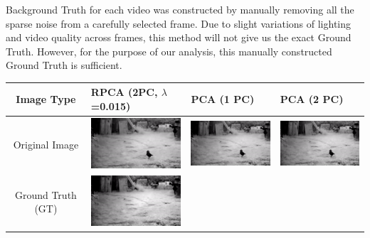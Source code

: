 \documentclass[11pt]{scrartcl} %
\theoremstyle{plain}
\begin{document}
Background Truth for each video was constructed by manually removing all the sparse noise from a carefully selected frame. Due to slight variations of lighting and video quality across frames, this method will not give us the exact Ground Truth. However, for the purpose of our analysis, this manually constructed Ground Truth is sufficient.
\bigskip
\begin{minipage}{\linewidth}
\bgroup
  \begin{tabular}{ | c | m{2.8cm} | m{2.8cm} | m{2.8cm} | }
    \hline
    Image Type & RPCA \linebreak (2PC, $\lambda$=0.015) & PCA \linebreak (1 PC) & PCA \linebreak (2 PC)
    \\ \hline
	Original \linebreak Image
    &
    \begin{minipage}{.3\textwidth}
      \includegraphics[width=\linewidth, width=25mm]{figures_video/crow/original.png}
    \end{minipage}
    & 
    \begin{minipage}{.3\textwidth}
      \includegraphics[width=\linewidth, width=25mm]{figures_video/crow/original.png}
    \end{minipage}
    &
    \begin{minipage}{.3\textwidth}
      \includegraphics[width=\linewidth, width=25mm]{figures_video/crow/original.png}
    \end{minipage}
    \\[5ex] \hline
	Ground Truth (GT)
	&
    \begin{minipage}{.3\textwidth}
      \includegraphics[width=\linewidth, width=25mm]{figures_video/crow/background.png}

\end{minipage}
\end{tabular}
\end{minipage}
\end{document}
